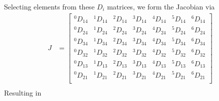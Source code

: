 \documentclass[onecolumn,10pt]{jhwhw}
\begin{document}
Selecting elements from these $D_i$ matrices, we form the Jacobian via
\begin{align*}
J &=
\left[\begin{matrix}
^0D_{14} & ^1D_{14} & ^2D_{14} & ^3D_{14} & ^4D_{14} & ^5D_{14} & ^6D_{14} \\
^0D_{24} & ^1D_{24} & ^2D_{24} & ^3D_{24} & ^4D_{24} & ^5D_{24} & ^6D_{24} \\
^0D_{34} & ^1D_{34} & ^2D_{34} & ^3D_{34} & ^4D_{34} & ^5D_{34} & ^6D_{34} \\
^0D_{32} & ^1D_{32} & ^2D_{32} & ^3D_{32} & ^4D_{32} & ^5D_{32} & ^6D_{32} \\
^0D_{13} & ^1D_{13} & ^2D_{13} & ^3D_{13} & ^4D_{13} & ^5D_{13} & ^6D_{13} \\
^0D_{21} & ^1D_{21} & ^2D_{21} & ^3D_{21} & ^4D_{21} & ^5D_{21} & ^6D_{21} \\
\end{matrix}\right] \\
\end{align*}
Resulting in
\end{document}
